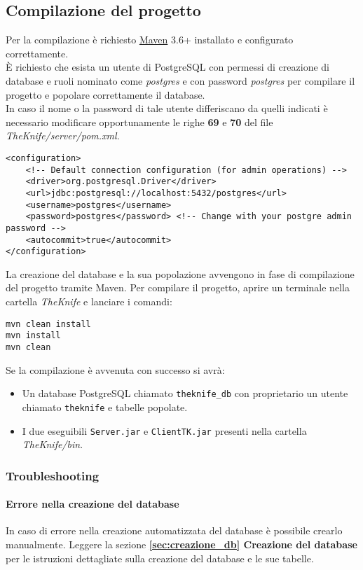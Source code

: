 \subsection{Compilazione del progetto}
\label{sec:compilazione}
Per la compilazione è richiesto \href{maven.apache.org}{Maven} 3.6+ installato e configurato correttamente.\\
\`E richiesto che esista un utente di PostgreSQL con permessi 
di creazione di database e ruoli nominato come \textit{postgres} e con 
password \textit{postgres} per compilare il progetto e popolare correttamente 
il database.\\
In caso il nome o la password di tale utente differiscano da quelli 
indicati
è necessario modificare opportunamente le righe \textbf{69} e \textbf{70} 
del file \textit{TheKnife/server/pom.xml}.
\begin{verbatim}
<configuration>
    <!-- Default connection configuration (for admin operations) -->
    <driver>org.postgresql.Driver</driver>
    <url>jdbc:postgresql://localhost:5432/postgres</url>
    <username>postgres</username>
    <password>postgres</password> <!-- Change with your postgre admin password -->
    <autocommit>true</autocommit>
</configuration>
\end{verbatim}
La creazione del database e la sua popolazione avvengono in fase di 
compilazione del progetto tramite Maven.
Per compilare il progetto, aprire un terminale nella cartella 
\textit{TheKnife} e lanciare i comandi:
\begin{verbatim}
mvn clean install
mvn install
mvn clean
\end{verbatim}
Se la compilazione è avvenuta con successo si avrà:
\begin{itemize}
    \item Un database PostgreSQL chiamato \texttt{theknife\_db} 
    con proprietario un utente chiamato \texttt{theknife}
    e tabelle popolate.
    \item I due eseguibili \texttt{Server.jar} e \texttt{ClientTK.jar} presenti
    nella cartella \textit{TheKnife/bin}.
\end{itemize}

\subsubsection{Troubleshooting}
\paragraph{Errore nella creazione del database}
In caso di errore nella creazione automatizzata del database è 
possibile crearlo manualmente. 
Leggere la sezione \textbf{\ref{sec:creazione_db} Creazione del database} 
per le istruzioni dettagliate sulla creazione del database e le sue tabelle.
